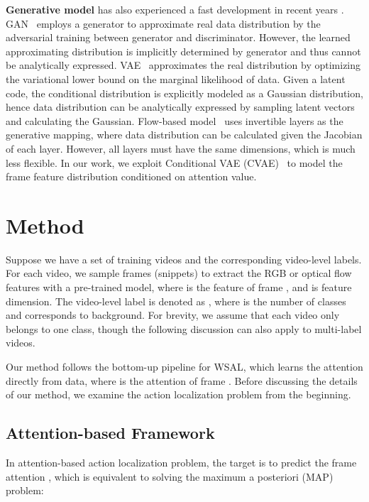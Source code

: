 \documentclass[10pt,twocolumn,letterpaper]{article}
\begin{document}
\textbf{Generative model} has also experienced a fast development in recent years \cite{kingma2013auto,goodfellow2014generative,higgins2017beta}.
GAN~\cite{goodfellow2014generative} employs a generator to approximate real data distribution by the adversarial training between generator and discriminator.
However, the learned approximating distribution is implicitly determined by generator and thus cannot be analytically expressed.
VAE~\cite{kingma2013auto} approximates the real distribution by optimizing the variational lower bound on the marginal likelihood of data.
Given a latent code, the conditional distribution is explicitly modeled as a Gaussian distribution, hence data distribution can be analytically expressed by sampling latent vectors and calculating the Gaussian. Flow-based model~\cite{kingma2018glow} uses invertible layers as the generative mapping, where data distribution can be calculated given the Jacobian of each layer.
However, all layers must have the same dimensions, which is much less flexible.
In our work, we exploit Conditional VAE (CVAE)~\cite{sohn2015learning} to model the frame feature distribution conditioned on attention value.


\section{Method}



Suppose we have a set of training videos and the corresponding video-level labels.
For each video, we sample  frames (snippets) to extract the RGB or optical flow features  with a pre-trained model, where  is the feature of frame , and  is feature dimension.
The video-level label is denoted as , where  is the number of classes and  corresponds to background.
For brevity, we assume that each video only belongs to one class, though the following discussion can also apply to multi-label videos.

Our method follows the bottom-up pipeline for WSAL, which learns the attention  directly from data, where  is the attention of frame .
Before discussing the details of our method, we examine the action localization problem from the beginning.



\subsection{Attention-based Framework}

In attention-based action localization problem, the target is to predict the frame attention , which is equivalent to solving the maximum a posteriori (MAP) problem:
\end{document}
